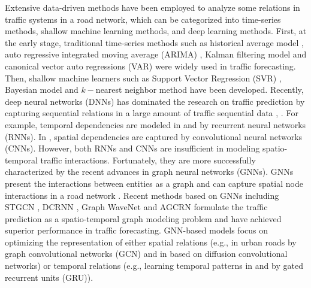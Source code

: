 Extensive data-driven methods have been employed to analyze some relations in traffic systems in a road network, which can be categorized into time-series methods, shallow machine learning methods, and deep learning methods. First, at the early stage, traditional time-series methods such as  historical average model \cite{liu2004summary}, auto regressive integrated moving average (ARIMA) \cite{williams2003modeling}, Kalman filtering model \cite{OKUTANI19841} and canonical  vector auto regressions (VAR) \cite{zivot2006vector} were widely used in traffic forecasting. Then, shallow machine learners such as Support Vector Regression (SVR) \cite{1364002}, Bayesian model \cite{1603558} and $k-$nearest neighbor method \cite{zhang2009short} have been developed. Recently, deep neural networks (DNNs) has dominated the research on traffic prediction by capturing sequential relations in a large amount of traffic sequential data \cite{lv2014traffic}, \cite{yu2017deep}. For example, temporal dependencies are modeled in \cite{zhao2017lstm} and \cite{ma2015long} by recurrent neural networks (RNNs). In \cite{wu2016short,ma2017learning,zhang2017deep}, spatial dependencies are captured by convolutional neural networks (CNNs). However, both RNNs and CNNs are insufficient in modeling spatio-temporal traffic interactions. Fortunately, they are more successfully characterized by the recent advances in graph neural networks (GNNs). GNNs present the interactions between entities as a graph and can capture spatial node interactions in a road network \cite{wu2020comprehensive, jiang2021graph}. Recent methods based on GNNs including STGCN \cite{yu2017spatio}, DCRNN \cite{li2017diffusion}, Graph WaveNet \cite{wu2019graph} and AGCRN \cite{bai2020adaptive} formulate the traffic prediction as a spatio-temporal graph modeling problem and have achieved superior performance in traffic forecasting. GNN-based models focus on optimizing the representation of either spatial relations (e.g., \cite{yu2017spatio} in urban roads by graph convolutional networks (GCN) and in \cite{li2017diffusion} based on diffusion convolutional networks) or temporal relations (e.g., learning temporal patterns in \cite{bai2020adaptive} and \cite{wang2020traffic} by gated recurrent units (GRU)).

